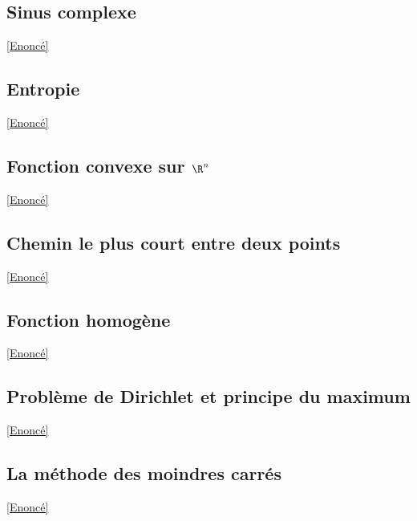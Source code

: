 \documentclass{book}
\begin{document}
	\subsection{Sinus complexe}\label{sec:sinus-complexe}
		\textcolor{blue}{\hyperref[Sinus complexe]{[Enoncé]}}\\
	
	\subsection{Entropie}\label{sec:entropie}
		\textcolor{blue}{\hyperref[Entropie]{[Enoncé]}}\\
	\subsection{Fonction convexe sur $\R^n$}\label{sec:fonction-convexe-sur-rn}
		\textcolor{blue}{\hyperref[Fonction convexe sur R^n]{[Enoncé]}}\\
	
	\subsection{Chemin le plus court entre deux points}
	\label{sec:chemin-le-plus-court-entre-deux-points}
	\textcolor{blue}{\hyperref[Chemin le plus court entre deux points]{[Enoncé]}}\\
	\subsection{Fonction homogène}
	\label{sec:fonction-homogene}
	\textcolor{blue}{\hyperref[Fonction homogène]{[Enoncé]}}\\
	
	\subsection{Problème de Dirichlet et principe du maximum}
	\label{sec:probleme-de-dirichlet-et-principe-du-maximum}
	\textcolor{blue}{\hyperref[Problème de Dirichlet et principe faible du maximum]{[Enoncé]}}\\
	
	\subsection{La méthode des moindres carrés}
	\label{sec:la-methode-des-moindres-carres}
	\textcolor{blue}{\hyperref[La méthode des moindres carrés]{[Enoncé]}}\\
	
\end{document}
